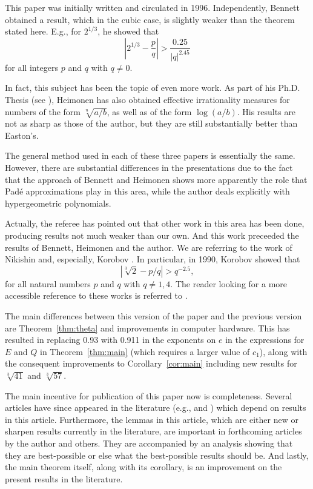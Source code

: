 \documentclass{jT}
\theoremstyle{definition}
\begin{document}
This paper was initially written and circulated in 1996. Independently, Bennett \cite{Benn}
obtained a result, which in the cubic case, is slightly weaker than the theorem stated here.
E.g., for $2^{1/3}$, he showed that
\begin{displaymath}
\left| 2^{1/3} - \frac{p}{q} \right| 
> \frac{0.25}{|q|^{2.45}} 
\end{displaymath}
for all integers $p$ and $q$ with $q \neq 0$.

In fact, this subject has been the topic of even more work. 
As part of his Ph.D. Thesis (see \cite{Hei}), Heimonen has 
also obtained effective irrationality measures for numbers 
of the form $\sqrt[n]{a/b}$, as well as of the form 
$\log (a/b)$. His results are not as sharp as those of the 
author, but they are still substantially better than Easton's. 

The general method used in each of these three papers is essentially 
the same. However, there are substantial differences in the 
presentations due to the fact that the approach of Bennett and 
Heimonen shows more apparently the role that Pad\'{e} approximations 
play in this area, while the author deals explicitly with 
hypergeometric polynomials.

Actually, the referee has pointed out that other work in this area has been done,
producing results not much weaker than our own. And this work preceeded
the results of Bennett, Heimonen and the author. We are referring to the work
of Nikishin \cite{Nik} and, especially, Korobov \cite{Kor}. In particular, in 1990,
Korobov showed that
\begin{displaymath}
\left| \sqrt[3]{2} - p/q \right| > q^{-2.5},
\end{displaymath}
for all natural numbers $p$ and $q$ with $q \neq 1, 4$. The reader looking
for a more accessible reference to these works is referred to \cite[pp. 38--39]{FN}.

The main differences between this version of the paper and the previous version are
Theorem~\ref{thm:theta} and improvements in computer hardware. This has resulted in
replacing 0.93 with 0.911 in the exponents on $e$ in the expressions for $E$ and $Q$
in Theorem~\ref{thm:main} (which requires a larger value of $c_{1}$), along with the
consequent improvements to Corollary~\ref{cor:main} including new results for
$\sqrt[3]{41}$ and $\sqrt[3]{57}$.

The main incentive for publication of this paper now is completeness. Several articles
have since appeared in the literature (e.g., \cite{LPV} and \cite{TVW}) which depend on
results in this article. Furthermore, the lemmas in this article, which are either new or
sharpen results currently in the literature, are important in forthcoming articles by
the author and others. They are accompanied by an analysis showing that they are best-possible
or else what the best-possible results should be. And lastly, the main theorem itself,
along with its corollary, is an improvement on the present results in the literature.
\end{document}
